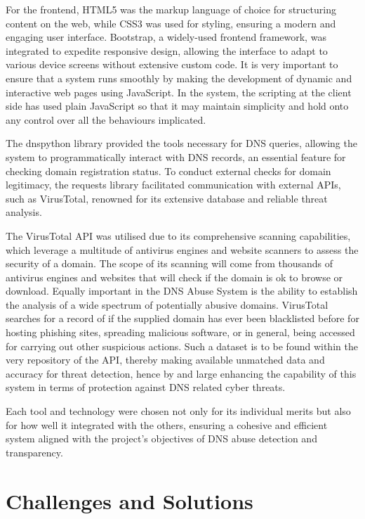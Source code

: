 For the frontend, HTML5 was the markup language of choice for structuring content on the web, while CSS3 was used for styling, ensuring a modern and engaging user interface. Bootstrap, a widely-used frontend framework, was integrated to expedite responsive design, allowing the interface to adapt to various device screens without extensive custom code. It is very important to ensure that a system runs smoothly by making the development of dynamic and interactive web pages using JavaScript. In the system, the scripting at the client side has used plain JavaScript so that it may maintain simplicity and hold onto any control over all the behaviours implicated.

The dnspython library provided the tools necessary for DNS queries, allowing the system to programmatically interact with DNS records, an essential feature for checking domain registration status. To conduct external checks for domain legitimacy, the requests library facilitated communication with external APIs, such as VirusTotal, renowned for its extensive database and reliable threat analysis. 

The VirusTotal API was utilised due to its comprehensive scanning capabilities, which leverage a multitude of antivirus engines and website scanners to assess the security of a domain. The scope of its scanning will come from thousands of antivirus engines and websites that will check if the domain is ok to browse or download. Equally important in the DNS Abuse System is the ability to establish the analysis of a wide spectrum of potentially abusive domains. VirusTotal searches for a record of if the supplied domain has ever been blacklisted before for hosting phishing sites, spreading malicious software, or in general, being accessed for carrying out other suspicious actions. Such a dataset is to be found within the very repository of the API, thereby making available unmatched data and accuracy for threat detection, hence by and large enhancing the capability of this system in terms of protection against DNS related cyber threats.


Each tool and technology were chosen not only for its individual merits but also for how well it integrated with the others, ensuring a cohesive and efficient system aligned with the project's objectives of DNS abuse detection and transparency.


\section{Challenges and Solutions}

